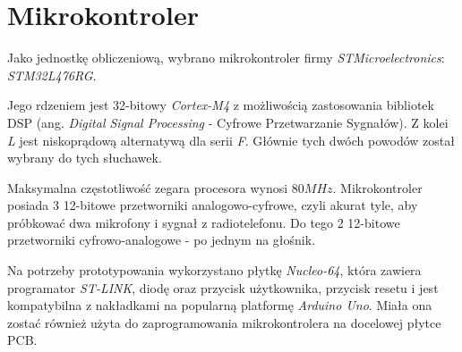 \section{Mikrokontroler}
\label{cha:uC}

Jako jednostkę obliczeniową, wybrano mikrokontroler firmy \textit{STMicroelectronics}: \textit{STM32L476RG}.

Jego rdzeniem jest 32-bitowy \textit{Cortex-M4} z możliwością zastosowania bibliotek DSP (ang. \textit{Digital Signal Processing} - Cyfrowe Przetwarzanie Sygnałów). Z kolei \textit{L} jest niskoprądową alternatywą dla serii \textit{F}. Głównie tych dwóch powodów został wybrany do tych słuchawek.

Maksymalna częstotliwość zegara procesora wynosi $80MHz$. Mikrokontroler posiada 3 12-bitowe przetworniki analogowo-cyfrowe, czyli akurat tyle, aby próbkować dwa mikrofony i sygnał z radiotelefonu. Do tego 2 12-bitowe przetworniki cyfrowo-analogowe - po jednym na głośnik\cite{STM32L4}.

Na potrzeby prototypowania wykorzystano płytkę \textit{Nucleo-64}, która zawiera programator \textit{ST-LINK}, diodę oraz przycisk użytkownika, przycisk resetu i jest kompatybilna z nakładkami na popularną platformę \textit{Arduino Uno}. Miała ona zostać również użyta do zaprogramowania mikrokontrolera na docelowej płytce PCB.

